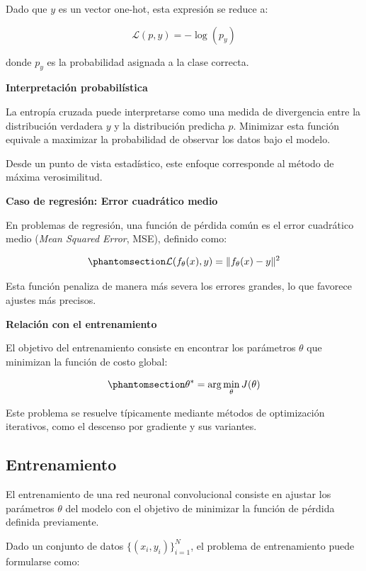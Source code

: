 \documentclass[
  spanish,
  us-letterpaper,
]{scrreprt}
\theoremstyle{definition}
\theoremstyle{remark}
\begin{document}
Dado que \(y\) es un vector one-hot, esta expresión se reduce a:

\[
\mathcal{L}(p, y) = -\log(p_{y})
\]

donde \(p_y\) es la probabilidad asignada a la clase correcta.

\textbf{Interpretación probabilística}

La entropía cruzada puede interpretarse como una medida de divergencia
entre la distribución verdadera \(y\) y la distribución predicha \(p\).
Minimizar esta función equivale a maximizar la probabilidad de observar
los datos bajo el modelo.

Desde un punto de vista estadístico, este enfoque corresponde al método
de máxima verosimilitud.

\textbf{Caso de regresión: Error cuadrático medio}

En problemas de regresión, una función de pérdida común es el error
cuadrático medio (\emph{Mean Squared Error}, MSE), definido como:

\begin{equation}\phantomsection\label{eq-mse}{
\mathcal{L}(f_\theta(x), y) = \| f_\theta(x) - y \|^2
}\end{equation}

Esta función penaliza de manera más severa los errores grandes, lo que
favorece ajustes más precisos.

\textbf{Relación con el entrenamiento}

El objetivo del entrenamiento consiste en encontrar los parámetros
\(\theta\) que minimizan la función de costo global:

\begin{equation}\phantomsection\label{eq-opt}{
\theta^* = \arg\min_{\theta} J(\theta)
}\end{equation}

Este problema se resuelve típicamente mediante métodos de optimización
iterativos, como el descenso por gradiente y sus variantes.

\subsection{Entrenamiento}\label{entrenamiento}

El entrenamiento de una red neuronal convolucional consiste en ajustar
los parámetros \(\theta\) del modelo con el objetivo de minimizar la
función de pérdida definida previamente.

Dado un conjunto de datos \(\{(x_i, y_i)\}_{i=1}^{N}\), el problema de
entrenamiento puede formularse como:
\end{document}
